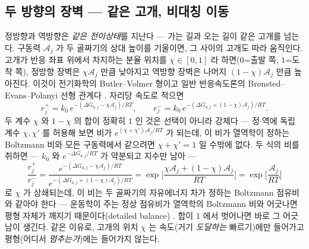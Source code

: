 \documentclass[11pt,a4paper]{article}
\begin{document}
\subsection{두 방향의 장벽 — 같은 고개, 비대칭 이동}
정방향과 역방향은 \emph{같은 전이상태}를 지난다 — 가는 길과 오는 길이 같은 고개를 넘는다. 구동력
$\mathcal A_j$ 가 두 골짜기의 상대 높이를 기울이면, 그 사이의 고개도 따라 움직인다. 고개가 반응 좌표 위에서
차지하는 분율 위치를 $\chi\in[0,1]$ 라 하면($0$=출발 쪽, $1$=도착 쪽), 정방향 장벽은 $\chi\mathcal A_j$
만큼 낮아지고 역방향 장벽은 나머지 $(1-\chi)\mathcal A_j$ 만큼 높아진다. 이것이 전기화학의
Butler--Volmer 형이고 일반 반응속도론의 Br\o nsted--Evans--Polanyi 선형 관계다
\cite{bardfaulkner,evanspolanyi1938}. 자리당 속도로 적으면
\begin{equation}
r_j^+=k_0\,e^{-(\Delta G_{a,j}-\chi\mathcal A_j)/RT},\qquad
r_j^-=k_0\,e^{-(\Delta G_{a,j}+(1-\chi)\mathcal A_j)/RT}.
\label{eq:bv}
\end{equation}
두 계수 $\chi$ 와 $1-\chi$ 의 합이 정확히 $1$ 인 것은 선택이 아니라 강제다 — 정$\cdot$역에 독립
계수 $\chi,\chi'$ 를 허용해 보면 비가 $e^{(\chi+\chi')\mathcal A_j/RT}$ 가 되는데, 이 비가
열역학이 정하는 Boltzmann 비와 모든 구동력에서 같으려면 $\chi+\chi'=1$ 일 수밖에 없다. 두 식의 비를 취하면 — $k_0$ 와 $e^{-\Delta G_{a,j}/RT}$ 가 약분되고 지수만 남아 —
\begin{equation}
\frac{r_j^+}{r_j^-}
=\frac{e^{-(\Delta G_{a,j}-\chi\mathcal A_j)/RT}}{e^{-(\Delta G_{a,j}+(1-\chi)\mathcal A_j)/RT}}
=\exp\!\Big[\frac{\chi\mathcal A_j+(1-\chi)\mathcal A_j}{RT}\Big]
=\exp\!\Big[\frac{\mathcal A_j}{RT}\Big]
\label{eq:db}
\end{equation}
로 $\chi$ 가 상쇄되는데, 이 비는 두 골짜기의 자유에너지 차가 정하는 Boltzmann 점유비와 같아야 한다 —
운동학이 주는 정상 점유비가 열역학의 Boltzmann 비와 어긋나면 평형 자체가 깨지기 때문이다(detailed
balance) \cite{bazant2013}. 합이 $1$ 에서 벗어나면
바로 그 어긋남이 생긴다. 같은 이유로, 고개의 위치 $\chi$ 는 속도(거기 \emph{도달하는} 빠르기)에만 들어가고
평형(어디서 \emph{멈추는가})에는 들어가지 않는다.
\end{document}
